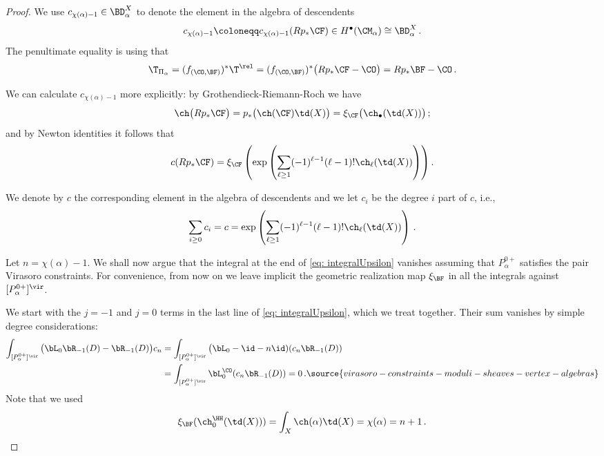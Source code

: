 \begin{proof}
We use $c_{\chi(\alpha)-1}\in \BD_\alpha^X$ to denote the element in the algebra of descendents
\[c_{\chi(\alpha)-1}\coloneqq c_{\chi(\alpha)-1}(Rp_\ast \CF)\in H^\bullet(\CM_\alpha)\cong \BD_\alpha^X\,.\]
The penultimate equality is using that
\[\T_{\Pi_\alpha}=(f_{(\CO,\BF)})^\ast \T^{\rel} =(f_{(\CO,\BF)})^\ast\big(Rp_\ast \CF-\CO\big)=Rp_\ast \BF-\CO\,.\]

We can calculate $c_{\chi(\alpha)-1}$ more explicitly: by Grothendieck-Riemann-Roch we have
\[\ch\big(Rp_\ast \CF\big)=p_\ast\big(\ch(\CF)\td(X)\big)=\xi_\CF\big(\ch_\bullet(\td(X))\big)\,;\]
and by Newton identities it follows that
\[c(Rp_\ast \CF)=\xi_\CF\left(\exp\left(\sum_{\ell\geq 1}(-1)^{\ell-1}(\ell-1)!\ch_\ell(\td(X))\right)\right).\]

We denote by $c$ the corresponding element in the algebra of descendents and we let $c_i$ be the degree $i$ part of $c$, i.e.,
\[\sum_{i\geq 0}c_i=c=\exp\left(\sum_{\ell\geq 1}(-1)^{\ell-1}(\ell-1)!\ch_\ell(\td(X))\right)\,.\]

Let $n=\chi(\alpha)-1$. We shall now argue that the integral at the end of \eqref{eq: integralUpsilon} vanishes assuming that $P_\alpha^{0+}$ satisfies the pair Virasoro constraints. For convenience, from now on we leave implicit the geometric realization map $\xi_\BF$ in all the integrals against $[P_\alpha^{0+}]^\vir$.

We start with the $j=-1$ and $j=0$ terms in the last line of \eqref{eq: integralUpsilon}, which we treat together.  Their sum vanishes by simple degree considerations:
\begin{align}\nonumber \int_{[P^{0+}_\alpha]^\vir} \big(\bL_0 \bR_{-1}(D)-\bR_{-1}(D)\big) c_{n}&= \int_{[P^{0+}_\alpha]^\vir} \big(\bL_0-\id-n\id)(c_n\bR_{-1}(D))\\
&=\int_{[P^{0+}_\alpha]^\vir} \bL_0^\CO(c_n\bR_{-1}(D))=0\,.\label{eq: j0j-1}
\source{virasoro-constraints-moduli-sheaves-vertex-algebras}
\end{align}
Note that we used
\[\xi_{\BF}(\ch_0^\HH(\td(X)))=\int_X \ch(\alpha)\td(X)=\chi(\alpha)=n+1\,.\]


\end{proof}

